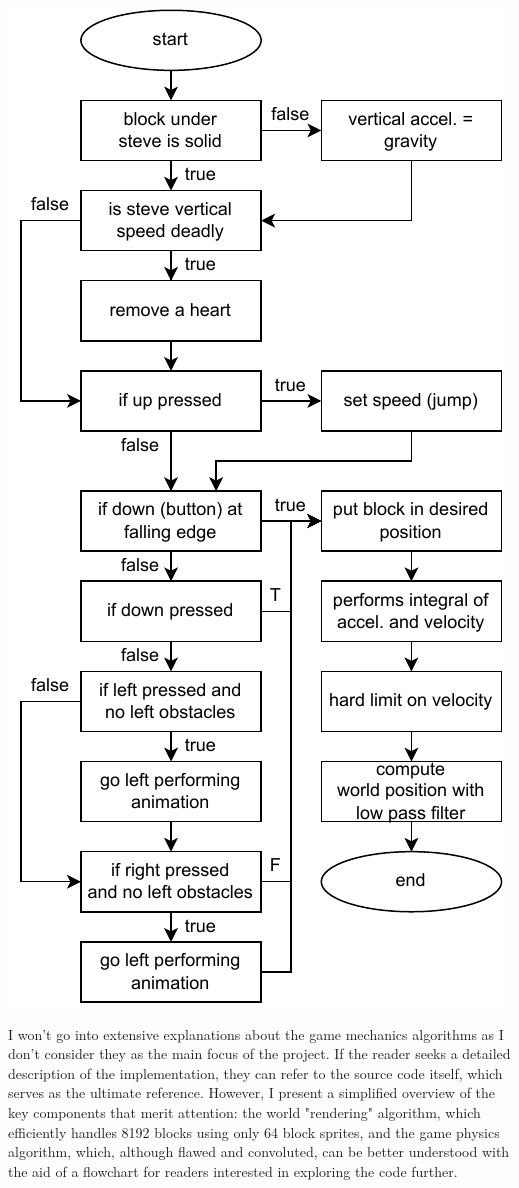 \documentclass[12pt,a4paper]{article}
\begin{document}
\begin{center}
\begin{minipage}{0.4\textwidth}
\includegraphics[scale=0.8]{schema4.pdf}
\label{fig:image2}
\end{minipage}
\end{center}

I won't go into extensive explanations about the game mechanics algorithms as I
don't consider they as the main focus of the project. If the reader seeks a
detailed description of the implementation, they can refer to the source code
itself, which serves as the ultimate reference. However, I present a
simplified overview of the key components that merit attention: the world
"rendering" algorithm, which efficiently handles 8192 blocks using only 64
block sprites, and the game physics algorithm, which, although flawed and
convoluted, can be better understood with the aid of a flowchart for readers
interested in exploring the code further.
\end{document}
